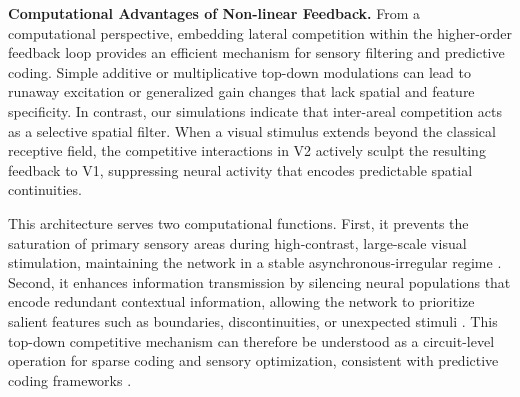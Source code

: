 \label{sec:disc_computational}
\textbf{Computational Advantages of Non-linear Feedback.} From a computational perspective, embedding lateral competition within the higher-order feedback loop provides an efficient mechanism for sensory filtering and predictive coding. Simple additive or multiplicative top-down modulations can lead to runaway excitation or generalized gain changes that lack spatial and feature specificity. In contrast, our simulations indicate that inter-areal competition acts as a selective spatial filter. When a visual stimulus extends beyond the classical receptive field, the competitive interactions in V2 actively sculpt the resulting feedback to V1, suppressing neural activity that encodes predictable spatial continuities.

This architecture serves two computational functions. First, it prevents the saturation of primary sensory areas during high-contrast, large-scale visual stimulation, maintaining the network in a stable asynchronous-irregular regime \citep{Brunel2000}. Second, it enhances information transmission by silencing neural populations that encode redundant contextual information, allowing the network to prioritize salient features such as boundaries, discontinuities, or unexpected stimuli \citep{Vinje2000}. This top-down competitive mechanism can therefore be understood as a circuit-level operation for sparse coding and sensory optimization, consistent with predictive coding frameworks \citep{Rao1999, Friston2005}.

